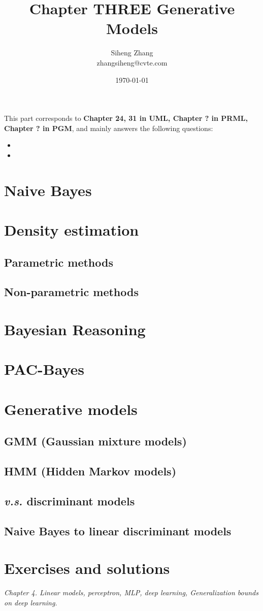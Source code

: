 \documentclass{article}
\author{Siheng Zhang\\zhangsiheng@cvte.com}
\title{Chapter THREE Generative Models}
\date{\today}
\begin{document}
\maketitle  

This part corresponds to \textbf{Chapter 24, 31 in UML, Chapter ? in PRML, Chapter ? in PGM}, and mainly answers the following questions:

\begin{itemize}
\item 
\item 
\end{itemize}

\tableofcontents
\newpage

\section{Naive Bayes}

\section{Density estimation}
	\subsection{Parametric methods}
	\subsection{Non-parametric methods}

\section{Bayesian Reasoning}

\section{PAC-Bayes}

\section{Generative models}
	\subsection{GMM (Gaussian mixture models)}
	\subsection{HMM (Hidden Markov models)}
	\subsection{\textit{v.s.} discriminant models}
	\subsection{Naive Bayes to linear discriminant models}


\section{Exercises and solutions}

\textit{
      Chapter 4. Linear models, perceptron, MLP, deep learning, Generalization bounds on deep learning.}
\end{document}
